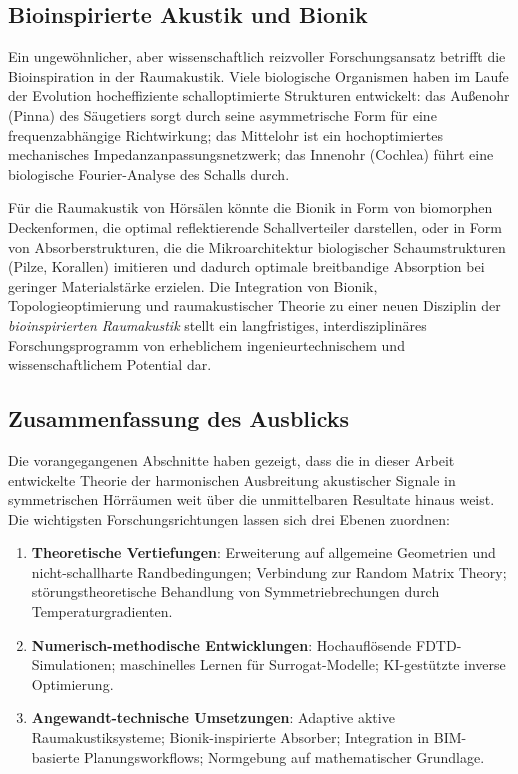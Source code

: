 ﻿\documentclass[12pt, a4paper]{article}
\theoremstyle{definition}
\theoremstyle{remark}
\begin{document}
\subsection{Bioinspirierte Akustik und Bionik}

Ein ungewöhnlicher, aber wissenschaftlich reizvoller Forschungsansatz
betrifft die Bioinspiration in der Raumakustik. Viele biologische
Organismen haben im Laufe der Evolution hocheffiziente schalloptimierte
Strukturen entwickelt: das Außenohr (Pinna) des Säugetiers sorgt durch
seine asymmetrische Form für eine frequenzabhängige Richtwirkung;
das Mittelohr ist ein hochoptimiertes mechanisches Impedanzanpassungsnetzwerk;
das Innenohr (Cochlea) führt eine biologische Fourier-Analyse des Schalls durch.

Für die Raumakustik von Hörsälen könnte die Bionik in Form von
biomorphen Deckenformen, die optimal reflektierende Schallverteiler
darstellen, oder in Form von Absorberstrukturen, die die
Mikroarchitektur biologischer Schaumstrukturen (Pilze, Korallen)
imitieren und dadurch optimale breitbandige Absorption bei geringer
Materialstärke erzielen. Die Integration von Bionik, Topologieoptimierung
und raumakustischer Theorie zu einer neuen Disziplin der
\emph{bioinspirierten Raumakustik} stellt ein langfristiges, interdisziplinäres
Forschungsprogramm von erheblichem ingenieurtechnischem und
wissenschaftlichem Potential dar.

\subsection{Zusammenfassung des Ausblicks}

Die vorangegangenen Abschnitte haben gezeigt, dass die in dieser Arbeit
entwickelte Theorie der harmonischen Ausbreitung akustischer Signale
in symmetrischen Hörräumen weit über die unmittelbaren Resultate hinaus
weist. Die wichtigsten Forschungsrichtungen lassen sich drei Ebenen zuordnen:

\begin{enumerate}
\item \textbf{Theoretische Vertiefungen}: Erweiterung auf allgemeine
  Geometrien und nicht-schallharte Randbedingungen; Verbindung zur
  Random Matrix Theory; störungstheoretische Behandlung von
  Symmetriebrechungen durch Temperaturgradienten.

\item \textbf{Numerisch-methodische Entwicklungen}: Hochauflösende
  FDTD-Simulationen; maschinelles Lernen für Surrogat-Modelle;
  KI-gestützte inverse Optimierung.

\item \textbf{Angewandt-technische Umsetzungen}: Adaptive aktive
  Raumakustiksysteme; Bionik-inspirierte Absorber; Integration
  in BIM-basierte Planungsworkflows; Normgebung auf mathematischer
  Grundlage.
\end{enumerate}
\end{document}

